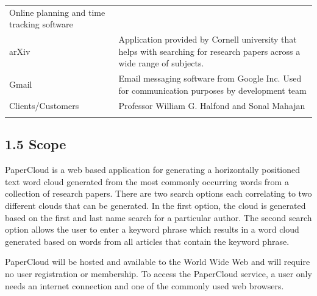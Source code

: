 \documentclass[]{article}
\begin{document}
\begin{longtable}[c]{@{}ll@{}}
\begin{minipage}[t]{0.47\columnwidth}
Online planning and time tracking software
\end{minipage}
\\\addlinespace
\begin{minipage}[t]{0.47\columnwidth}\raggedright
arXiv
\end{minipage} & \begin{minipage}[t]{0.47\columnwidth}\raggedright
Application provided by Cornell university that helps with searching for research papers across a wide range of subjects.
\end{minipage}
\\\addlinespace
\begin{minipage}[t]{0.47\columnwidth}\raggedright
Gmail
\end{minipage} & \begin{minipage}[t]{0.47\columnwidth}\raggedright
Email messaging software from Google Inc. Used for communication purposes by development team
\end{minipage}
\\\addlinespace
\begin{minipage}[t]{0.47\columnwidth}\raggedright
Clients/Customers
\end{minipage} & \begin{minipage}[t]{0.47\columnwidth}\raggedright
Professor William G. Halfond and Sonal Mahajan
\end{minipage}
\\\addlinespace
\bottomrule
\end{longtable}



\subsection{1.5 Scope}\label{scope}

PaperCloud is a web based application for generating a horizontally
positioned text word cloud generated from the most commonly occurring
words from a collection of research papers. There are two search options
each correlating to two different clouds that can be generated. In the
first option, the cloud is generated based on the first and last name
search for a particular author. The second search option allows the user
to enter a keyword phrase which results in a word cloud generated based
on words from all articles that contain the keyword phrase.

PaperCloud will be hosted and available to the World Wide Web and will
require no user registration or membership. To access the PaperCloud
service, a user only needs an internet connection and one of the
commonly used web browsers.
\end{document}
